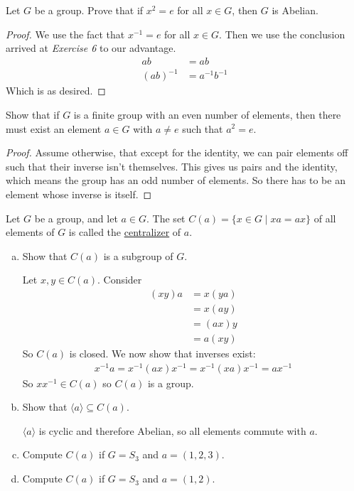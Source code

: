  Let $G$ be a group. Prove that if $x^2 = e$ for all $x\in G$, then $G$ is Abelian. 
\begin{proof}
We use the fact that $x^{-1}=e$ for all $x\in G$. Then we use the conclusion arrived at \textit{Exercise 6} to our advantage. 
\begin{align*}
ab &= ab \\
(ab)^{-1} &= a^{-1}b^{-1}
\end{align*}
	Which is as desired. 
\end{proof}

 Show that if $G$ is a finite group with an even number of elements, then there must exist an element $a\in G$ with $a\neq e$ such that $a^2 = e$. 
\begin{proof}
Assume otherwise, that except for the identity, we can pair elements off such that their inverse isn't themselves. This gives us pairs and the identity, which means the group has an odd number of elements. So there has to be an element whose inverse is itself. 	
\end{proof}

 Let $G$ be a group, and let $a\in G$. The set $C(a)=\{x\in G\mid xa=ax\}$ of all elements of $G$ is called the \ul{centralizer} of $a$. 
\begin{enumerate}[(a)]
	\item Show that $C(a)$ is a subgroup of $G$. 
	
	Let $x, y\in C(a)$. Consider
	\begin{align*}
	(xy)a &= x(ya) \\
	 &= x(ay) \\
	 &= (ax)y \\
	 &= a(xy)
	\end{align*}
	So $C(a)$ is closed. We now show that inverses exist: 
	\begin{align*}
		x^{-1}a = x^{-1}(ax)x^{-1} = x^{-1}(xa)x^{-1} = ax^{-1}
	\end{align*}
	So $xx^{-1}\in C(a)$ so $C(a)$ is a group. 
	\item Show that $\langle a\rangle \subseteq C(a)$. 
	
	$\langle a\rangle$ is cyclic and therefore Abelian, so all elements commute with $a$. 
	\item Compute $C(a)$ if $G = S_3$ and $a = (1, 2, 3)$. 
	\item Compute $C(a)$ if $G=S_3$ and $a=(1, 2)$. 
\end{enumerate}
